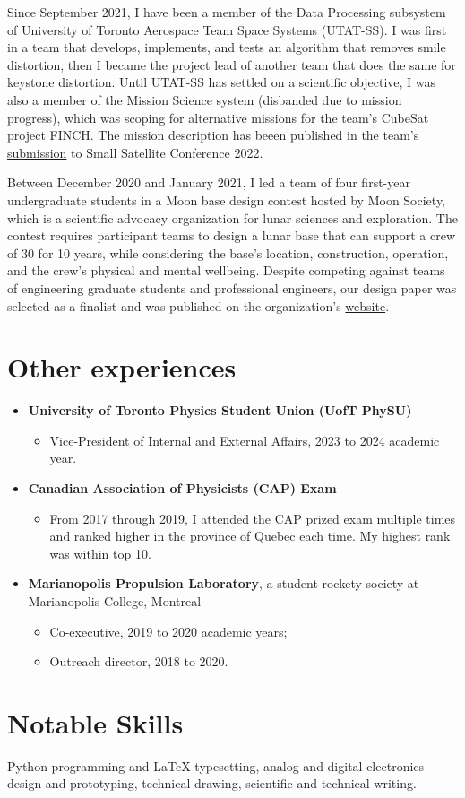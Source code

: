 \documentclass{article}
\newcommand{\cvsection}[1]{\section*{\rmfamily#1}}
\begin{document}
Since September 2021, I have been a member of the Data Processing subsystem of University of Toronto Aerospace Team Space Systems (UTAT-SS). I was first in a team that develops, implements, and tests an algorithm that removes smile distortion, then I became the project lead of another team that does the same for keystone distortion. Until UTAT-SS has settled on a scientific objective, I was also a member of the Mission Science system (disbanded due to mission progress), which was scoping for alternative missions for the team's CubeSat project FINCH. The mission description has beeen published in the team's \href{https://digitalcommons.usu.edu/smallsat/2022/all2022/88/}{submission} to Small Satellite Conference 2022.

Between December 2020 and January 2021, I led a team of four first-year undergraduate students in a Moon base design contest hosted by Moon Society, which is a scientific advocacy organization for lunar sciences and exploration. The contest requires participant teams to design a lunar base that can support a crew of 30 for 10 years, while considering the base's location, construction, operation, and the crew's physical and mental wellbeing. Despite competing against teams of engineering graduate students and professional engineers, our design paper was selected as a finalist and was published on the organization's \href{https://www.moonsociety.org/news/2021/03/10/announcement-of-winners-for-the-moon-societys-first-moon-base-design-contest/}{website}.

\cvsection{Other experiences}
\begin{itemize}
    \item \textbf{University of Toronto Physics Student Union (UofT PhySU)}
    \begin{itemize}
        \item Vice-President of Internal and External Affairs, 2023 to 2024 academic year.
    \end{itemize}

    \item \textbf{Canadian Association of Physicists (CAP) Exam}
    \begin{itemize}
        \item From 2017 through 2019, I attended the CAP prized exam multiple times and ranked higher in the province of Quebec each time. My highest rank was within top 10. 
    \end{itemize}

    \item \textbf{Marianopolis Propulsion Laboratory}, a student rockety society at Marianopolis College, Montreal
    \begin{itemize}
        \item Co-executive, 2019 to 2020 academic years;
        \item Outreach director, 2018 to 2020.
    \end{itemize}

\end{itemize}

\cvsection{Notable Skills}

\hspace{2em}Python programming and LaTeX typesetting, analog and digital electronics design and prototyping, technical drawing, scientific and technical writing.
\end{document}
